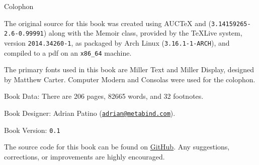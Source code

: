 
\cleartoverso
\pagestyle{empty}

\newlength{\colophon}
\calccentering{\colophon}
\begin{adjustwidth*}{\colophon}{\colophon}

\begin{flushleft}
\setlength{\parskip}{1.5\baselineskip}
{\large Colophon}

The original source for this book was created using AUC\TeX{} and
\XeTeX{} (\texttt{3.14159265-2.6-0.99991}) along with the Memoir
class, provided by the \TeX Live system, version
\texttt{2014.34260-1}, as packaged by Arch Linux
(\texttt{3.16.1-1-ARCH}), and compiled to a pdf on an
\texttt{x86\_64} machine.

The primary fonts used in this book are Miller Text and Miller
Display, designed by Matthew Carter.  Computer Modern and Consolas
were used for the colophon.

Book Data: There are 206 pages, 82665 words, and 32 footnotes. 

Book Designer: Adrian Patino
(\href{mailto:adrian@metabind.com}{\texttt{adrian@metabind.com}}).

Book Version: \texttt{0.1}

The source code for this book can be found on
\href{https://github.com/metabind/spirit-hazlitt}{GitHub}.  Any
suggestions, corrections, or improvements are highly encouraged.
\end{flushleft}
\end{adjustwidth*}

